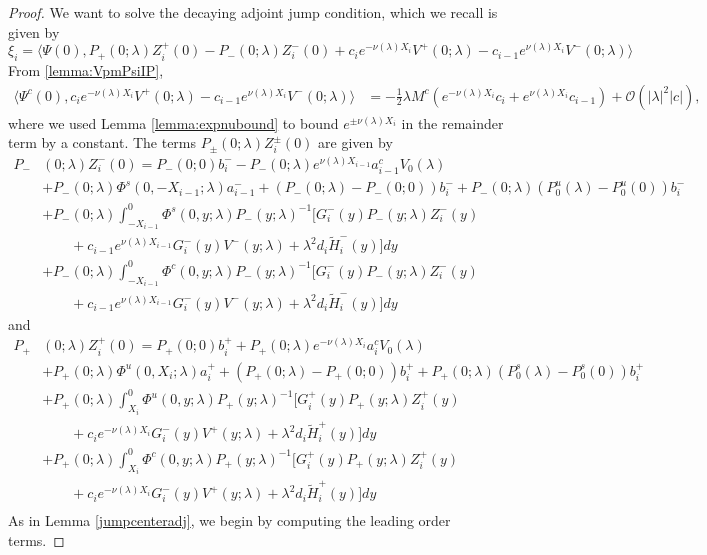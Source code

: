 \documentclass[thesis.tex]{subfiles}
\begin{document}
\begin{lemma}
\begin{proof}
We want to solve the decaying adjoint jump condition, which we recall is given by
\[
\xi_i = 
\langle \Psi(0), P_+(0; \lambda) Z_i^+(0) - P_-(0; \lambda) Z_i^-(0) + c_i e^{-\nu(\lambda)X_i}V^+(0; \lambda) - c_{i-1} e^{\nu(\lambda)X_i} V^-(0; \lambda) \rangle 
\]
From \cref{lemma:VpmPsiIP},
\begin{align}\label{PsiVpmjump}
\langle \Psi^c(0), c_i e^{-\nu(\lambda)X_i}V^+(0; \lambda) - c_{i-1} e^{\nu(\lambda)X_i} V^-(0; \lambda)  \rangle &= -\frac{1}{2}\lambda M^c\left( e^{-\nu(\lambda)X_i}c_i + e^{\nu(\lambda)X_i}c_{i-1}\right) + \mathcal{O}(|\lambda|^2 |c| ),
\end{align}
where we used Lemma \ref{lemma:expnubound} to bound $e^{\pm\nu(\lambda)X_i}$ in the remainder term by a constant. The terms $P_\pm(0; \lambda) Z_i^\pm(0)$ are given by
\begin{align*}
P_-&(0; \lambda) Z_i^-(0) = P_-(0; 0) b_i^- - P_-(0; \lambda) e^{\nu(\lambda) X_{i-1}} a^c_{i-1}V_0(\lambda) \\
&+ P_-(0; \lambda) \Phi^s(0, -X_{i-1}; \lambda) a_{i-1}^- + (P_-(0; \lambda) - P_-(0; 0))b_i^- + P_-(0; \lambda)(P_0^u(\lambda) - P_0^u(0))b_i^- \\
&+ P_-(0; \lambda) \int_{-X_{i-1}}^0 \Phi^s(0, y; \lambda) P_-(y; \lambda)^{-1} \big[ G_i^-(y) P_-(y; \lambda) Z_i^-(y) \\
&\qquad+ c_{i-1} e^{\nu(\lambda)X_{i-1}} G_i^-(y) V^-(y; \lambda) + \lambda^2 d_i \tilde{H}_i^-(y)\big]dy \\
&+ P_-(0; \lambda) \int_{-X_{i-1}}^0 \Phi^c(0, y; \lambda) P_-(y; \lambda)^{-1} \big[ G_i^-(y) P_-(y; \lambda) Z_i^-(y) \\
&\qquad+ c_{i-1} e^{\nu(\lambda)X_{i-1}} G_i^-(y) V^-(y; \lambda) + \lambda^2 d_i \tilde{H}_i^-(y)\big] dy
\end{align*}
and
\begin{align*}
P_+&(0; \lambda) Z_i^+(0) = P_+(0; 0) b_i^+ + P_+(0; \lambda) e^{-\nu(\lambda)X_i} a^c_i V_0(\lambda) \\
&+ P_+(0; \lambda) \Phi^u(0, X_i; \lambda) a_i^+ + (P_+(0; \lambda) - P_+(0; 0)) b_i^+ + P_+(0; \lambda) (P_0^s(\lambda) - P_0^s(0)) b_i^+ \\
&+ P_+(0; \lambda) \int_{X_i}^0 \Phi^u(0, y; \lambda) P_+(y; \lambda)^{-1} \big[ G_i^+(y) P_+(y; \lambda) Z_i^+(y) \\
&\qquad+ c_i e^{-\nu(\lambda)X_i} G_i^-(y) V^+(y; \lambda) + \lambda^2 d_i \tilde{H}_i^+(y)\big] dy \\
&+ P_+(0; \lambda) \int_{X_i}^0 \Phi^c(0, y; \lambda) P_+(y; \lambda)^{-1} \big[ G_i^+(y) P_+(y; \lambda) Z_i^+(y) \\
&\qquad+ c_i e^{-\nu(\lambda)X_i} G_i^-(y) V^+(y; \lambda) + \lambda^2 d_i \tilde{H}_i^+(y)\big] dy \\
\end{align*}
As in Lemma \ref{jumpcenteradj}, we begin by computing the leading order terms.


\end{proof}
\end{lemma}
\end{document}
